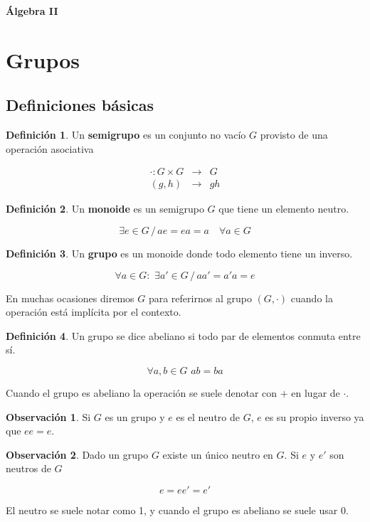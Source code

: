 \documentclass{article}
\theoremstyle{definition}
\newtheorem{defn}{Definici\'on}[subsection]
\newtheorem{obs}{Observaci\'on}[subsection]
\begin{document}
\begin{center}
{\bf \Large \'Algebra II}
\end{center}
\section{Grupos}
\subsection{Definiciones b\'asicas}
\begin{defn}
Un {\bf semigrupo} es un conjunto no vac\'io $G$ provisto de una operaci\'on asociativa

\begin{eqnarray*}
\cdot : G \times G &\rightarrow& G\\
(g,h) &\rightarrow& gh
\end{eqnarray*}
\end{defn}
\begin{defn}
Un {\bf monoide} es un semigrupo $G$ que tiene un elemento neutro.

$$\exists e \in G \, / \,ae = ea = a \quad \forall a \in G$$
\end{defn}

\begin{defn}
Un {\bf grupo} es un monoide donde todo elemento tiene un inverso.

$$\forall a \in G: \,\, \exists a' \in G \, / \, aa' = a'a = e$$
\end{defn}

En muchas ocasiones diremos $G$ para referirnos al grupo $(G,\cdot)$ cuando la operaci\'on est\'a impl\'icita por el contexto.

\begin{defn}
Un grupo se dice abeliano si todo par de elementos conmuta entre s\'i.

$$\forall a,b \in G \,\, ab = ba$$

\noindent Cuando el grupo es abeliano la operaci\'on se suele denotar con $+$ en lugar de $\cdot$.
\end{defn}

\begin{obs}
Si $G$ es un grupo y $e$ es el neutro de $G$, $e$ es su propio inverso ya que $ee = e$.
\end{obs}

\begin{obs}
Dado un grupo $G$ existe un \'unico neutro en $G$. Si $e$ y $e'$ son neutros de $G$

$$e = ee' = e'$$

\noindent El neutro se suele notar como 1, y cuando el grupo es abeliano se suele usar 0.
\end{obs}
\end{document}
